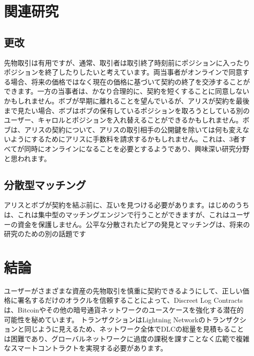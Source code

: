 \documentclass[11pt]{article}
\begin{document}
\section*{関連研究}

\subsection*{更改}

先物取引は有用ですが、通常、取引者は取引終了時刻前にポジションに入ったりポジションを終了したりしたいと考えています。両当事者がオンラインで同意する場合、将来の価格ではなく現在の価格に基づいて契約の終了を交渉することができます。一方の当事者は、かなり合理的に、契約を短くすることに同意しないかもしれません。ボブが早期に離れることを望んでいるが、アリスが契約を最後まで見たい場合、ボブはボブの保有しているポジションを取ろうとしている別のユーザー、キャロルとポジションを入れ替えることができるかもしれません。ボブは、アリスの契約について、アリスの取引相手の公開鍵を除いては何も変えないようにするためにアリスに手数料を請求するかもしれません。これは、3者すべてが同時にオンラインになることを必要とするようであり、興味深い研究分野と思われます。

\subsection*{分散型マッチング}

アリスとボブが契約を結ぶ前に、互いを見つける必要があります。はじめのうちは、これは集中型のマッチングエンジンで行うことができますが、これはユーザーの資金を保護しません。公平な分散されたピアの発見とマッチングは、将来の研究のための別の話題です

\section*{結論}

ユーザーがさまざまな資産の先物取引を慎重に契約できるようにして、正しい価格に署名するだけのオラクルを信頼することによって、Discreet Log Contractsは、Bitcoinやその他の暗号通貨ネットワークのユースケースを強化する潜在的可能性を秘めています。 トランザクションはLightning Networkのトランザクションと同じように見えるため、ネットワーク全体でDLCの総量を見積もることは困難であり、グローバルネットワークに過度の課税を課すことなく広範で複雑なスマートコントラクトを実現する必要があります。



\end{document}
